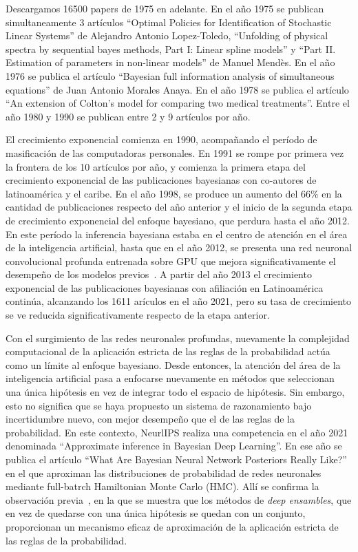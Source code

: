 \documentclass[a4paper,11pt]{book}
\theoremstyle{definition}
\begin{document}

Descargamos 16500 papers de 1975 en adelante.
%
En el año 1975 se publican simultaneamente 3 artículos ``Optimal Policies for Identification of Stochastic Linear Systems'' de Alejandro Antonio Lopez-Toledo, ``Unfolding of physical spectra by sequential bayes methods, Part I: Linear spline models'' y ``Part II. Estimation of parameters in non-linear models'' de Manuel Mendès.
%
En el año 1976 se publica el artículo ``Bayesian full information analysis of simultaneous equations'' de Juan Antonio Morales Anaya.
%
En el año 1978 se publica el artículo ``An extension of Colton's model for comparing two medical treatments''.
%
Entre el año 1980 y 1990 se publican entre 2 y 9 artículos por año.


El crecimiento exponencial comienza en 1990, acompañando el período de masificación de las computadoras personales.
%
En 1991 se rompe por primera vez la frontera de los 10 artículos por año, y comienza la primera etapa del crecimiento exponencial de las publicaciones bayesianas con co-autores de latinoamérica y el caribe.
%
En el año 1998, se produce un aumento del 66\% en la cantidad de publicaciones respecto del año anterior y el inicio de la segunda etapa de crecimiento exponencial del enfoque bayesiano, que perdura hasta el año 2012.
%
En este período la inferencia bayesiana estaba en el centro de atención en el área de la inteligencia artificial, hasta que en el año 2012, se presenta una red neuronal convolucional profunda entrenada sobre GPU que mejora significativamente el desempeño de los modelos previos~\cite{Krizhevsky2012}.
%
A partir del año 2013 el crecimiento exponencial de las publicaciones bayesianas con afiliación en Latinoamérica continúa, alcanzando los 1611 arículos en el año 2021, pero su tasa de crecimiento se ve reducida significativamente respecto de la etapa anterior.


Con el surgimiento de las redes neuronales profundas, nuevamente la complejidad computacional de la aplicación estricta de las reglas de la probabilidad actúa como un límite al enfoque bayesiano.
%
Desde entonces, la atención del área de la inteligencia artificial pasa a enfocarse nuevamente en métodos que seleccionan una única hipótesis en vez de integrar todo el espacio de hipótesis.
%
Sin embargo, esto no significa que se haya propuesto un sistema de razonamiento bajo incertidumbre nuevo, con mejor desempeño que el de las reglas de la probabilidad.
%
En este contexto, NeurlIPS realiza una competencia en el año 2021 denominada ``Approximate inference in Bayesian Deep Learning''.
%
En ese año se publica el artículo ``What Are Bayesian Neural Network Posteriors Really Like?''~\cite{Izmailov2021} en el que aproximan las distribuciones de probabilidad de redes neuronales mediante full-batrch Hamiltonian Monte Carlo (HMC).
%
Allí se confirma la observación previa~\cite{Wilson2020}, en la que se muestra que los métodos de \emph{deep ensambles}, que en vez de quedarse con una única hipótesis se quedan con un conjunto, proporcionan un mecanismo eficaz de aproximación de la aplicación estricta de las reglas de la probabilidad.
\end{document}
